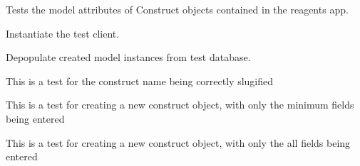 \documentclass[letterpaper,10pt,english]{sphinxmanual}
\begin{document}

\begin{fulllineitems}
\label{api:experimentdb.reagents.tests.ConstructModelTests}
Tests the model attributes of Construct objects contained in the reagents app.

\begin{fulllineitems}
\label{api:experimentdb.reagents.tests.ConstructModelTests.setUp}
Instantiate the test client.

\end{fulllineitems}


\begin{fulllineitems}
\label{api:experimentdb.reagents.tests.ConstructModelTests.tearDown}
Depopulate created model instances from test database.

\end{fulllineitems}


\begin{fulllineitems}
\label{api:experimentdb.reagents.tests.ConstructModelTests.test_construct_slugify}
This is a test for the construct name being correctly slugified

\end{fulllineitems}


\begin{fulllineitems}
\label{api:experimentdb.reagents.tests.ConstructModelTests.test_create_cell_line_minimal}
This is a test for creating a new construct object, with only the minimum fields being entered

\end{fulllineitems}


\begin{fulllineitems}
\label{api:experimentdb.reagents.tests.ConstructModelTests.test_create_construct_all_fields}
This is a test for creating a new construct object, with only the all fields being entered

\end{fulllineitems}


\end{fulllineitems}
\end{document}
